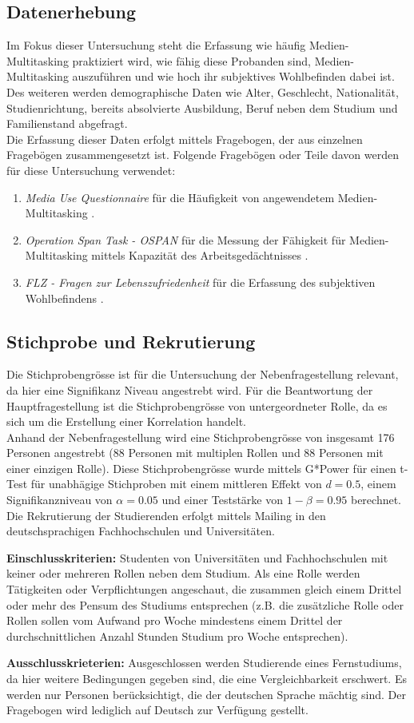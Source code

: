 \subsection*{Datenerhebung}
Im Fokus dieser Untersuchung steht die Erfassung wie häufig Medien-Multitasking praktiziert wird, wie fähig diese Probanden sind, Medien-Multitasking auszuführen und wie hoch ihr subjektives Wohlbefinden dabei ist. \\ 
Des weiteren werden demographische Daten wie Alter, Geschlecht, Nationalität, Studienrichtung, bereits absolvierte Ausbildung, Beruf neben dem Studium und Familienstand abgefragt.\\
Die Erfassung dieser Daten erfolgt mittels Fragebogen, der aus einzelnen Fragebögen zusammengesetzt ist. Folgende Fragebögen oder Teile davon werden für diese Untersuchung verwendet:
\begin{enumerate}
    \item \textit{Media Use Questionnaire} für die Häufigkeit von angewendetem Medien-Multitasking \cite{Ophir2009}.
    \item \textit{Operation Span Task - OSPAN} für die Messung der Fähigkeit für Medien-Multitasking mittels Kapazität des Arbeitsgedächtnisses \cite{Unsworth2005, Sanbonmatsu2013}.
    \item \textit{FLZ - Fragen zur Lebenszufriedenheit} für die Erfassung des subjektiven Wohlbefindens \cite{Braehler1999}.
\end{enumerate}
\subsection*{Stichprobe und Rekrutierung}
Die Stichprobengrösse ist für die Untersuchung der Nebenfragestellung relevant, da hier eine Signifikanz Niveau angestrebt wird. Für die Beantwortung der Hauptfragestellung ist die Stichprobengrösse von untergeordneter Rolle, da es sich um die Erstellung einer Korrelation handelt.\\
Anhand der Nebenfragestellung wird eine Stichprobengrösse von insgesamt 176 Personen angestrebt (88 Personen mit multiplen Rollen und 88 Personen mit einer einzigen Rolle). Diese Stichprobengrösse wurde mittels G*Power für einen t-Test für unabhägige Stichproben mit einem mittleren Effekt von $d = 0.5$, einem Signifikanzniveau von $\alpha=0.05$ und einer Teststärke von $1-\beta=0.95$ berechnet.
Die Rekrutierung der Studierenden erfolgt mittels Mailing in den deutschsprachigen Fachhochschulen und Universitäten.\par
\textbf{Einschlusskriterien:}
Studenten von Universitäten und Fachhochschulen mit keiner oder mehreren Rollen neben dem Studium. Als eine Rolle werden Tätigkeiten oder Verpflichtungen angeschaut, die zusammen gleich einem Drittel oder mehr des Pensum des Studiums entsprechen (z.B. die zusätzliche Rolle oder Rollen sollen vom Aufwand pro Woche mindestens einem Drittel der durchschnittlichen Anzahl Stunden Studium pro Woche entsprechen).\par
\textbf{Ausschlusskrieterien:}
Ausgeschlossen werden Studierende eines Fernstudiums, da hier weitere Bedingungen gegeben sind, die eine Vergleichbarkeit erschwert.
Es werden nur Personen berücksichtigt, die der deutschen Sprache mächtig sind. Der Fragebogen wird lediglich auf Deutsch zur Verfügung gestellt.
